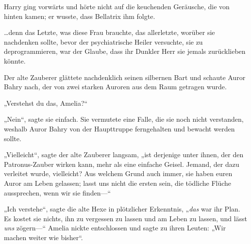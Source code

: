 Harry ging vorwärts und hörte nicht auf die keuchenden Geräusche, die von hinten kamen; er wusste, dass Bellatrix ihm folgte.

…denn das Letzte, was diese Frau brauchte, das allerletzte, worüber sie nachdenken sollte, bevor der psychiatrische Heiler versuchte, sie zu deprogrammieren, war der Glaube, dass ihr Dunkler Herr sie jemals zurücklieben könnte.

\later

Der alte Zauberer glättete nachdenklich seinen silbernen Bart und schaute Auror Bahry nach, der von zwei starken Auroren aus dem Raum getragen wurde.

„Verstehst du das, Amelia?“

„Nein“, sagte sie einfach. Sie vermutete eine Falle, die sie noch nicht verstanden, weshalb Auror Bahry von der Haupttruppe ferngehalten und bewacht werden sollte.

„Vielleicht“, sagte der alte Zauberer langsam, „ist derjenige unter ihnen, der den Patronus-Zauber wirken kann, mehr als eine einfache Geisel. Jemand, der dazu verleitet wurde, vielleicht? Aus welchem Grund auch immer, sie haben euren Auror am Leben gelassen; lasst uns nicht die ersten sein, die tödliche Flüche aussprechen, wenn wir sie finden—“

„Ich verstehe“, sagte die alte Hexe in plötzlicher Erkenntnis, „\emph{das} war ihr Plan. Es kostet sie nichts, ihn zu vergessen zu lassen und am Leben zu lassen, und lässt \emph{uns} zögern—“ Amelia nickte entschlossen und sagte zu ihren Leuten: „Wir machen weiter wie bisher“.

